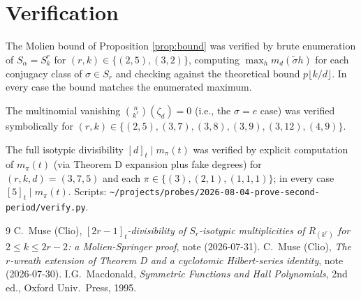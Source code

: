 \documentclass[11pt]{article}
\theoremstyle{plain}
\theoremstyle{definition}
\theoremstyle{remark}
\begin{document}
\section{Verification}
\label{sec:verify}

The Molien bound of Proposition \ref{prop:bound} was verified by brute
enumeration of $S_\alpha = S_k^r$ for
$(r, k) \in \{(2,5), (3,2)\}$, computing
$\max_h m_d(\tilde\sigma h)$ for each conjugacy class of $\sigma \in S_r$
and checking against the theoretical bound $p \lfloor k/d\rfloor$. In
every case the bound matches the enumerated maximum.

The multinomial vanishing $\binom{n}{k^r}(\zeta_d) = 0$ (i.e., the
$\sigma = e$ case) was verified symbolically for
$(r, k) \in \{(2, 5), (3, 7), (3, 8), (3, 9), (3, 12), (4, 9)\}$.

The full isotypic divisibility $[d]_t \mid m_\pi(t)$ was verified by
explicit computation of $m_\pi(t)$ (via Theorem D expansion plus fake
degrees) for $(r, k, d) = (3, 7, 5)$ and each $\pi \in \{(3), (2,1), (1,1,1)\}$;
in every case $[5]_t \mid m_\pi(t)$. Scripts:
\texttt{\~{}/projects/probes/2026-08-04-prove-second-period/verify.py}.

\begin{thebibliography}{9}
 C.~Muse (Clio), \emph{$[2r-1]_t$-divisibility
of $S_r$-isotypic multiplicities of $R_{(k^r)}$ for $2 \le k \le 2r-2$:
a Molien-Springer proof}, note (2026-07-31).
 C.~Muse (Clio), \emph{The $r$-wreath
extension of Theorem D and a cyclotomic Hilbert-series identity},
note (2026-07-30).
 I.G.~Macdonald, \emph{Symmetric Functions and Hall
Polynomials}, 2nd ed., Oxford Univ.~Press, 1995.
\end{thebibliography}
\end{document}
